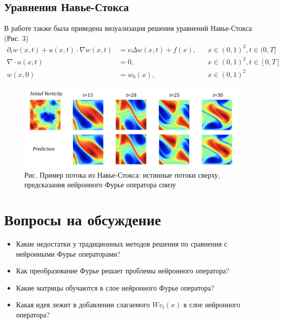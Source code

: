 \subsection{Уравнения Навье-Стокса}
В работе также была приведена визуализация решения уравнений Навье-Стокса (Рис. 3)
$$
\begin{aligned}
\partial_{t} w(x, t)+u(x, t) \cdot \nabla w(x, t) &=\nu \Delta w(x, t)+f(x), & & x \in(0,1)^{2}, t \in(0, T] \\
\nabla \cdot u(x, t) &=0, & & x \in(0,1)^{2}, t \in[0, T] \\
w(x, 0) &=w_{0}(x), & & x \in(0,1)^{2}
\end{aligned}
$$

\begin{figure}[h]
	\centering
	\includegraphics[width=0.99\textwidth]{chapters/severilov_s1/pics/navier_example}
	\caption{Рис. Пример потока из Навье-Стокса: истинные потоки сверху, предсказания нейронного Фурье оператора снизу}
	\label{fig:experiment}
\end{figure}

	
\section{Вопросы на обсуждение}

	\begin{itemize}
	\item Какие недостатки у традиционных методов решения по сравнения с нейронными Фурье  операторами?
	\item Как преобразование Фурье решает проблемы нейронного оператора? 
	\item Какие матрицы обучаются в слое нейронного Фурье оператора?
	\item Какая идея лежит в добавлении слагаемого $Wv_t(x)$ в слое нейронного оператора? 
\end{itemize}